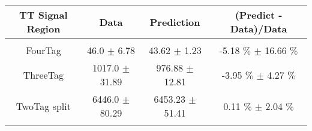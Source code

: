 \begin{footnotesize} 
\begin{tabular}{c|c|c|c} 
TT Signal Region & Data & Prediction & (Predict - Data)/Data \\ 
\hline\hline 
& & & \\ 
FourTag & 46.0 $\pm$ 6.78 & 43.62 $\pm$ 1.23 & -5.18 $\%$  $\pm$ 16.66 $\%$ \\ 
\hline 
ThreeTag & 1017.0 $\pm$ 31.89 & 976.88 $\pm$ 12.81 & -3.95 $\%$  $\pm$ 4.27 $\%$ \\ 
\hline 
TwoTag split & 6446.0 $\pm$ 80.29 & 6453.23 $\pm$ 51.41 & 0.11 $\%$  $\pm$ 2.04 $\%$ \\ 
& & & \\ 
\hline\hline 
\end{tabular} 
\end{footnotesize} 
\newline 
